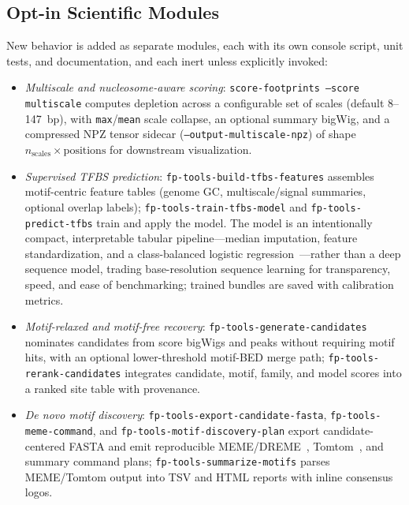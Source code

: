 \documentclass[biomedinformatics,article,submit,pdftex,moreauthors]{Definitions/mdpi}
\begin{document}
\subsection{Opt-in Scientific Modules}

New behavior is added as separate modules, each with its own console script,
unit tests, and documentation, and each inert unless explicitly invoked:
\begin{itemize}
  \item \emph{Multiscale and nucleosome-aware scoring}: \texttt{score-footprints
        --score multiscale} computes depletion across a configurable set of scales
        (default 8--147~bp), with \texttt{max}/\texttt{mean} scale collapse, an
        optional summary bigWig, and a compressed NPZ tensor sidecar
        (\texttt{--output-multiscale-npz}) of shape $n_\text{scales}\times
        \text{positions}$ for downstream visualization.
  \item \emph{Supervised TFBS prediction}: \texttt{fp-tools-build-tfbs-features}
        assembles motif-centric feature tables (genome GC, multiscale/signal
        summaries, optional overlap labels); \texttt{fp-tools-train-tfbs-model}
        and \texttt{fp-tools-predict-tfbs} train and apply the model. The model is
        an intentionally compact, interpretable tabular pipeline---median
        imputation, feature standardization, and a class-balanced logistic
        regression~\cite{pedregosa2011sklearn}---rather than a deep sequence model, trading base-resolution
        sequence learning for transparency, speed, and ease of benchmarking;
        trained bundles are saved with calibration metrics.
  \item \emph{Motif-relaxed and motif-free recovery}:
        \texttt{fp-tools-generate-candidates} nominates candidates from score
        bigWigs and peaks without requiring motif hits, with an optional
        lower-threshold motif-BED merge path; \texttt{fp-tools-rerank-candidates}
        integrates candidate, motif, family, and model scores into a ranked site
        table with provenance.
  \item \emph{De novo motif discovery}: \texttt{fp-tools-export-candidate-fasta},
        \texttt{fp-tools-meme-command}, and \texttt{fp-tools-motif-discovery-plan}
        export candidate-centered FASTA and emit reproducible
        MEME/DREME~\cite{bailey2015meme}, Tomtom~\cite{gupta2007tomtom},
        and summary command plans; \texttt{fp-tools-summarize-motifs} parses
        MEME/Tomtom output into TSV and HTML reports with inline consensus logos.

\end{itemize}
\end{document}
